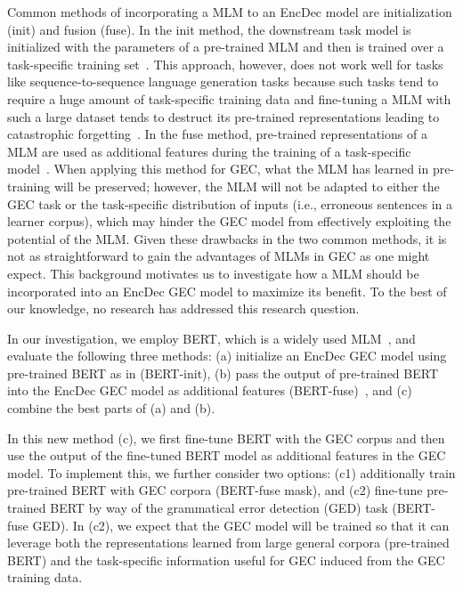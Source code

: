 \documentclass[11pt,a4paper]{article}
\begin{document}
Common methods of incorporating a MLM to an EncDec model are initialization (init) and fusion (fuse).
In the init method, the downstream task model is initialized with the parameters of a pre-trained MLM and then is trained over a task-specific training set~\cite{lample2019cross,rothe2019leveraging}.
This approach, however, does not work well for tasks like sequence-to-sequence language generation tasks because such tasks tend to require a huge amount of task-specific training data and fine-tuning a MLM with such a large dataset tends to destruct its pre-trained representations leading to catastrophic forgetting~\cite{Zhu2020IncorporatingBI,McCloskey1989CatastrophicII}.
In the fuse method, pre-trained representations of a MLM are used as additional features during the training of a task-specific model~\cite{Zhu2020IncorporatingBI}.
When applying this method for GEC, what the MLM has learned in pre-training will be preserved; however, the MLM will not be adapted to either the GEC task or the task-specific distribution of inputs (i.e., erroneous sentences in a learner corpus), which may hinder the GEC model from effectively exploiting the potential of the MLM.
Given these drawbacks in the two common methods, it is not as straightforward to gain the advantages of MLMs in GEC as one might expect.
This background motivates us to investigate how a MLM should be incorporated into an EncDec GEC model to maximize its benefit. 
To the best of our knowledge, no research has addressed this research question. 

In our investigation, we employ BERT, which is a widely used MLM~\cite{Qiu2020PretrainedMF}, and evaluate the following three methods: (a) initialize an EncDec GEC model using pre-trained BERT as in \citet{lample2019cross} (BERT-init), (b) pass the output of pre-trained BERT into the EncDec GEC model as additional features (BERT-fuse)~\cite{Zhu2020IncorporatingBI}, and (c) combine the best parts of (a) and (b). 

In this new method (c), we first fine-tune BERT with the GEC corpus and then use the output of the fine-tuned BERT model as additional features in the GEC model.
To implement this, we further consider two options:
(c1) additionally train pre-trained BERT with GEC corpora (BERT-fuse mask), and 
(c2) fine-tune pre-trained BERT by way of the grammatical error detection (GED) task  (BERT-fuse GED).
In (c2), we expect that the GEC model will be trained so that it can leverage both the representations learned from large general corpora (pre-trained BERT) and the task-specific information useful for GEC induced from the GEC training data.
\end{document}
